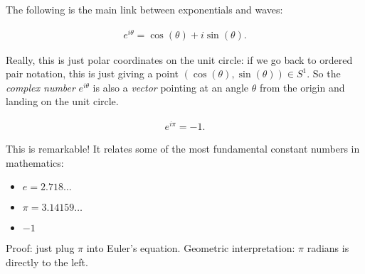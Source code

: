 \begin{remark}

The following is the main link between exponentials and waves:

\end{remark}

\begin{proposition}

\begin{align*}
e^{i\theta} = \cos(\theta) + i\sin(\theta)
.\end{align*}

\end{proposition}

\begin{remark}

Really, this is just polar coordinates on the unit circle: if we go back
to ordered pair notation, this is just giving a point
\((\cos(\theta), \sin(\theta)) \in S^1\). So the \emph{complex number}
\(e^{i\theta}\) is also a \emph{vector} pointing at an angle \(\theta\)
from the origin and landing on the unit circle.

\end{remark}

\begin{proposition}

\begin{align*}
e^{i\pi} = -1
.\end{align*}

\end{proposition}

\begin{remark}

This is remarkable! It relates some of the most fundamental constant
numbers in mathematics:

\begin{itemize}
\tightlist
\item
  \(e = 2.718\ldots\)
\item
  \(\pi = 3.14159\ldots\)
\item
  \(-1\)
\end{itemize}

Proof: just plug \(\pi\) into Euler's equation. Geometric
interpretation: \(\pi\) radians is directly to the left.

\end{remark}

